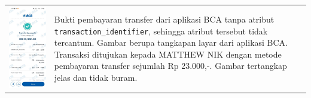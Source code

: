 \begin{table}[h!]
\begin{tabularx}{\textwidth}{m{} X}
        \includegraphics[width=\linewidth]{images/contoh-data/tf-1.jpg}
        & 
        Bukti pembayaran transfer dari aplikasi BCA tanpa atribut \texttt{transaction\_identifier}, sehingga atribut tersebut tidak tercantum. Gambar berupa tangkapan layar dari aplikasi BCA. Transaksi ditujukan kepada MATTHEW NIK dengan metode pembayaran transfer sejumlah Rp 23.000,-. Gambar tertangkap jelas dan tidak buram. \\
    \end{tabularx}
\end{table}

